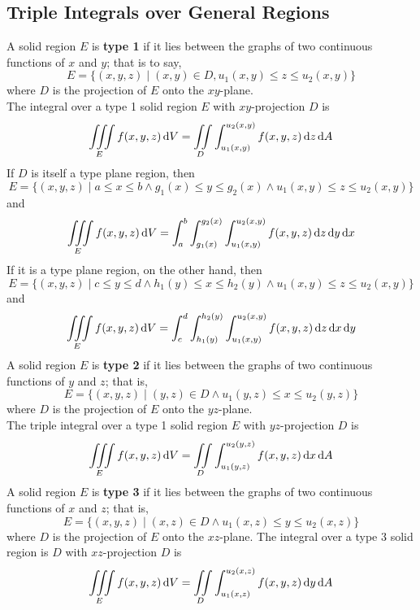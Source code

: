 \documentclass[../Calculus \Roman{3}.tex]{subfiles}
\begin{document}
		\subsection*{Triple Integrals over General Regions}
			A solid region $E$ is \textbf{type 1} if it lies between the graphs of two continuous functions of $x$ and $y$; that is to say,
				\[E = \{(x, y, z) \mid (x, y) \in D, u_1(x, y) \le z \le u_2(x, y)\}\]
				where $D$ is the projection of $E$ onto the $xy$-plane. \\
				The integral over a type 1 solid region $E$ with $xy$-projection $D$ is
					\[\iiint\limits_E f(x, y, z)\,\mathrm{d} V = \iint\limits_D\int_{u_1(x, y)}^{u_2(x, y)} f(x, y, z)\,\mathrm{d} z\,\mathrm{d} A\]
				If $D$ is itself a type  plane region, then
					\[E = \{(x, y, z) \mid a \le x \le b \land g_1(x) \le y \le g_2(x) \land u_1(x, y) \le z \le u_2(x, y)\}\]
					and
					\[\iiint\limits_E f(x, y, z)\,\mathrm{d} V = \int_a^b\int_{g_1(x)}^{g_2(x)}\int_{u_1(x, y)}^{u_2(x, y)} f(x, y, z)\,\mathrm{d} z\,\mathrm{d} y\,\mathrm{d} x\]
				If it is a type  plane region, on the other hand, then
					\[E = \{(x, y, z) \mid c \le y \le d \land h_1(y) \le x \le h_2(y) \land u_1(x, y) \le z \le u_2(x, y)\}\]
					and
					\[\iiint\limits_E f(x, y, z)\,\mathrm{d} V = \int_c^d\int_{h_1(y)}^{h_2(y)}\int_{u_1(x, y)}^{u_2(x, y)} f(x, y, z)\,\mathrm{d} z\,\mathrm{d} x\,\mathrm{d} y\]
			A solid region $E$ is \textbf{type 2} if it lies between the graphs of two continuous functions of $y$ and $z$; that is,
				\[E = \{(x, y, z) \mid (y, z) \in D \land u_1(y, z) \le x \le u_2(y, z)\}\]
				where $D$ is the projection of $E$ onto the $yz$-plane. \\
				The triple integral over a type 1 solid region $E$ with $yz$-projection $D$ is
					\[\iiint\limits_E f(x, y, z)\,\mathrm{d} V = \iint\limits_D\int_{u_1(y, z)}^{u_2(y, z)} f(x, y, z)\,\mathrm{d} x\,\mathrm{d} A\]
			A solid region $E$ is \textbf{type 3} if it lies between the graphs of two continuous functions of $x$ and $z$; that is,
				\[E = \{(x, y, z) \mid (x, z) \in D \land u_1(x, z) \le y \le u_2(x, z)\}\]
				where $D$ is the projection of $E$ onto the $xz$-plane.
				The integral over a type 3 solid region is $D$ with $xz$-projection $D$ is
					\[\iiint\limits_E f(x, y, z)\,\mathrm{d} V = \iint\limits_D\int_{u_1(x, z)}^{u_2(x, z)} f(x, y, z)\,\mathrm{d} y\,\mathrm{d} A\]
\end{document}
